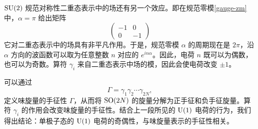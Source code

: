 $\mathop{\mathrm{SU}}(2)$ 规范对称性二重态表示中的场还有另一个效应。即在规范零模\eqref{gauge-zm}中，$\alpha=\pi$ 给出矩阵
\begin{equation}
\begin{pmatrix}-1 & 0 \\0 & -1\end{pmatrix}
\end{equation}
它对二重态表示中的场具有非平凡作用。于是，规范零模 $\alpha$ 的周期现在是 $2\pi$，沿 $\alpha$ 方向的波函数可以取为任意整数 $n$ 对应的 $e^{in\alpha}$。因此，电荷 $n$ 既可以为偶数，也可以为奇数。算符 $\gamma_i$ 来自二重态表示中场的模，因此会使电荷改变 $\pm1$。

可以通过
\begin{equation}
\Gamma=\gamma_1\gamma_2 \cdots \gamma_{2N},
\end{equation}
定义味旋量的手征性 $\Gamma$，从而将 $\mathop{\mathrm{SO}}(2N)$ 的旋量分解为正手征和负手征旋量。算符 $\gamma_i$ 的作用会改变味旋量的手征性。结合上一段所见的 ${\mathrm{U}}(1)$ 电荷的行为，我们得出结论：单极子态的 ${\mathrm{U}}(1)$ 电荷的奇偶性，与味旋量表示的手征性相关。
